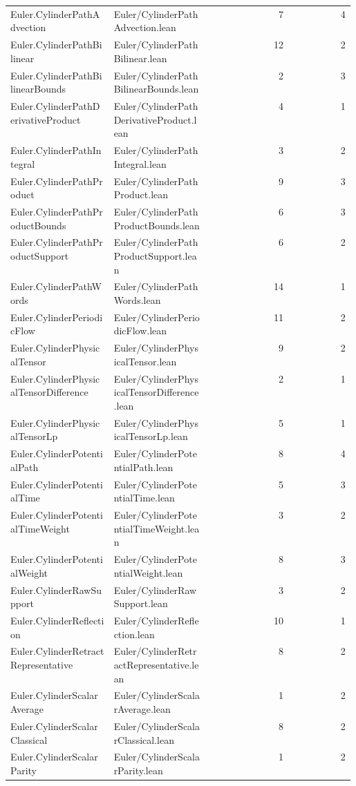 \begin{longtable}{p{0.30\linewidth}p{0.28\linewidth}rr}
Euler.CylinderPathAdvection & Euler/CylinderPathAdvection.lean & 7 & 4\\
Euler.CylinderPathBilinear & Euler/CylinderPathBilinear.lean & 12 & 2\\
Euler.CylinderPathBilinearBounds & Euler/CylinderPathBilinearBounds.lean & 2 & 3\\
Euler.CylinderPathDerivativeProduct & Euler/CylinderPathDerivativeProduct.lean & 4 & 1\\
Euler.CylinderPathIntegral & Euler/CylinderPathIntegral.lean & 3 & 2\\
Euler.CylinderPathProduct & Euler/CylinderPathProduct.lean & 9 & 3\\
Euler.CylinderPathProductBounds & Euler/CylinderPathProductBounds.lean & 6 & 3\\
Euler.CylinderPathProductSupport & Euler/CylinderPathProductSupport.lean & 6 & 2\\
Euler.CylinderPathWords & Euler/CylinderPathWords.lean & 14 & 1\\
Euler.CylinderPeriodicFlow & Euler/CylinderPeriodicFlow.lean & 11 & 2\\
Euler.CylinderPhysicalTensor & Euler/CylinderPhysicalTensor.lean & 9 & 2\\
Euler.CylinderPhysicalTensorDifference & Euler/CylinderPhysicalTensorDifference.lean & 2 & 1\\
Euler.CylinderPhysicalTensorLp & Euler/CylinderPhysicalTensorLp.lean & 5 & 1\\
Euler.CylinderPotentialPath & Euler/CylinderPotentialPath.lean & 8 & 4\\
Euler.CylinderPotentialTime & Euler/CylinderPotentialTime.lean & 5 & 3\\
Euler.CylinderPotentialTimeWeight & Euler/CylinderPotentialTimeWeight.lean & 3 & 2\\
Euler.CylinderPotentialWeight & Euler/CylinderPotentialWeight.lean & 8 & 3\\
Euler.CylinderRawSupport & Euler/CylinderRawSupport.lean & 3 & 2\\
Euler.CylinderReflection & Euler/CylinderReflection.lean & 10 & 1\\
Euler.CylinderRetractRepresentative & Euler/CylinderRetractRepresentative.lean & 8 & 2\\
Euler.CylinderScalarAverage & Euler/CylinderScalarAverage.lean & 1 & 2\\
Euler.CylinderScalarClassical & Euler/CylinderScalarClassical.lean & 8 & 2\\
Euler.CylinderScalarParity & Euler/CylinderScalarParity.lean & 1 & 2\\

\end{longtable}
